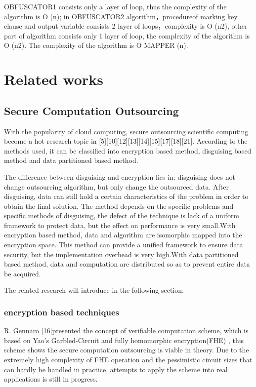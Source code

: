 \documentclass[runningheads,a4paper]{llncs}
\begin{document}
OBFUSCATOR1 consists only a layer of loop, thus the complexity of the algorithm is O (n); in OBFUSCATOR2 algorithm，procedureof marking key clause and output variable consists 2 layer of loops，complexity is O (n2), other part of algorithm consists only 1 layer of loop, the complexity of the algorithm is O (n2). The complexity of the algorithm is O MAPPER (n).
\section{Related works} 
\subsection{Secure Computation Outsourcing}

With the popularity of cloud computing, secure outsourcing scientific computing become a hot research topic in [5][10][12][13][14][15][17][18][21]. According to the methods used, it can be classified into encryption based method, disguising based method and data partitioned based method.

The difference between disguising and encryption lies in: disguising does not change outsourcing algorithm, but only change the outsourced data. After disguising, data can still hold a certain characteristics of the problem in order to obtain the final solution. The method depends on the specific problems and specific methods of disguising, the defect of the technique is lack of a uniform framework to protect data, but the effect on performance is very small.With encryption based method, data and algorithm are isomorphic mapped into the encryption space. This method can provide a unified framework to ensure data security, but the implementation overhead is very high.With data partitioned based method, data and computation are distributed so as to prevent entire data be acquired.    

The related research will introduce in the following section.
\subsubsection{encryption based techniques}

R. Gennaro [16]presented the concept of verifiable computation scheme, which is based on Yao’s Garbled-Circuit and fully homomorphic encryption(FHE) , this scheme shows the secure computation outsourcing is viable in theory. Due to the extremely high complexity of FHE operation and the pessimistic circuit sizes that can hardly be handled in practice, attempts to apply the scheme into real applications is still in progress.
\end{document}
